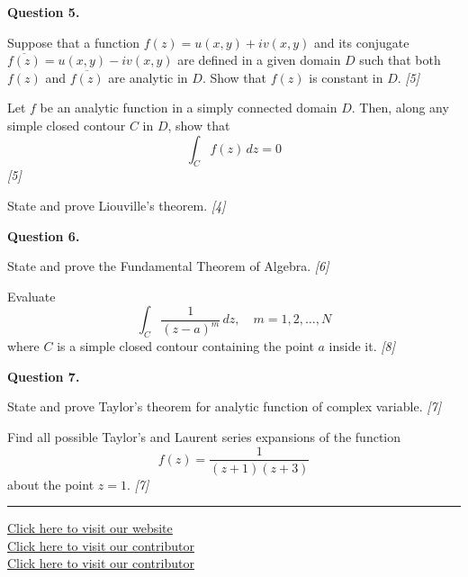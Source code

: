 \documentclass[11pt,a4paper]{article}
\newcommand{\pts}[1]{\hfill   \textit{[#1]}}
\begin{document}
\medskip


\noindent   \textbf{Question 5.}

\begin{parts}
  \item Suppose that a function $f(z) = u(x,y)+iv(x,y)$ and its conjugate $\overline{f(z)} = u(x,y)-iv(x,y)$ are defined in a given domain $D$ such that both $f(z)$ and $\overline{f(z)}$ are analytic in $D$. Show that $f(z)$ is constant in $D$. \pts{5}
  \item Let $f$ be an analytic function in a simply connected domain $D$. Then, along any simple closed contour $C$ in $D$, show that
  \[ \int_{C} f(z) \,dz = 0 \] \pts{5}
  \item State and prove Liouville's theorem. \pts{4}
\end{parts}

\medskip


\noindent   \textbf{Question 6.}

\begin{parts}
  \item State and prove the Fundamental Theorem of Algebra. \pts{6}
  \item Evaluate
  \[ \int_{C} \frac{1}{(z-a)^m} \,dz, \quad m = 1, 2, \dots, N \]
  where $C$ is a simple closed contour containing the point $a$ inside it. \pts{8}
\end{parts}

\medskip


\noindent   \textbf{Question 7.}

\begin{parts}
  \item State and prove Taylor's theorem for analytic function of complex variable. \pts{7}
  \item Find all possible Taylor's and Laurent series expansions of the function
  \[ f(z) = \frac{1}{(z+1)(z+3)} \]
  about the point $z = 1$. \pts{7}
\end{parts}




\vfill
\rule{\linewidth}{0.4pt}

\begin{center}\small
\href{https://bhu-exam.vercel.app/}{Click here to visit our website}\\[4pt]\href{https://me-aryan.vercel.app/}{Click here to visit our contributor}\\[4pt]\href{https://quashan-me.vercel.app/}{Click here to visit our contributor}
\end{center}
\end{document}
